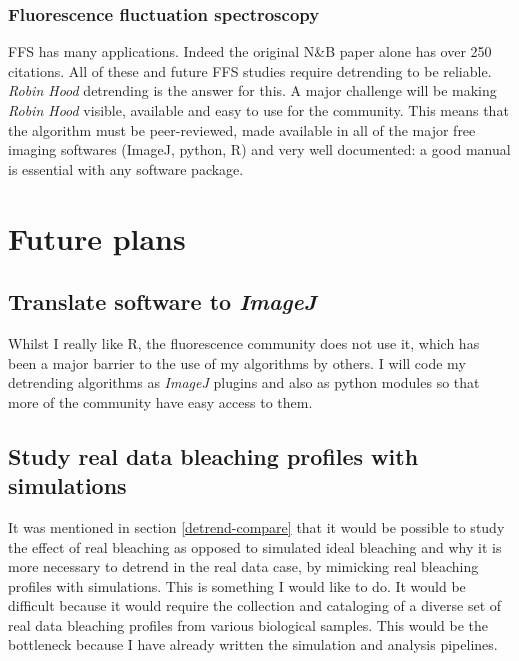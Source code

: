 \documentclass[12pt,]{book}
\theoremstyle{definition}
\theoremstyle{definition}
\theoremstyle{definition}
\theoremstyle{remark}
\begin{document}
\subsection{Fluorescence fluctuation
spectroscopy}\label{fluorescence-fluctuation-spectroscopy-1}

FFS has many applications. Indeed the original N\&B paper \citep{NB}
alone has over 250 citations. All of these and future FFS studies
require detrending to be reliable. \emph{Robin Hood} detrending is the
answer for this. A major challenge will be making \emph{Robin Hood}
visible, available and easy to use for the community. This means that
the algorithm must be peer-reviewed, made available in all of the major
free imaging softwares (ImageJ, python, R) and very well documented: a
good manual is essential with any software package.

\chapter{Future plans}\label{future-plans}

\section{\texorpdfstring{Translate software to
\emph{ImageJ}}{Translate software to ImageJ}}\label{translate-software-to-imagej}

Whilst I really like R, the fluorescence community does not use it,
which has been a major barrier to the use of my algorithms by others. I
will code my detrending algorithms as \emph{ImageJ} plugins and also as
python modules so that more of the community have easy access to them.

\section{Study real data bleaching profiles with
simulations}\label{mimic}

It was mentioned in section \ref{detrend-compare} that it would be
possible to study the effect of real bleaching as opposed to simulated
ideal bleaching and why it is more necessary to detrend in the real data
case, by mimicking real bleaching profiles with simulations. This is
something I would like to do. It would be difficult because it would
require the collection and cataloging of a diverse set of real data
bleaching profiles from various biological samples. This would be the
bottleneck because I have already written the simulation and analysis
pipelines.
\end{document}

